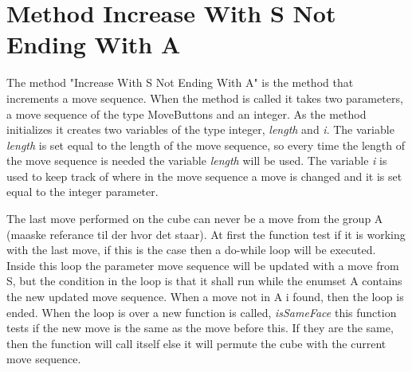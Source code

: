 \section{Method Increase With S Not Ending With A}

The method "Increase With S Not Ending With A" is the method that increments a move sequence. When the method is called it takes two parameters, a move sequence of the type MoveButtons and an integer. As the method initializes it creates two variables of the type integer, \textit{length} and \textit{i}. The variable \textit{length} is set equal to the length of the move sequence, so every time the length of the move sequence is needed the variable \textit{length} will be used. The variable \textit{i} is used to keep track of where in the move sequence a move is changed and it is set equal to the integer parameter. 

The last move performed on the cube can never be a move from the group A (maaske referance til der hvor det staar). At first the function test if it is working with the last move, if this is the case then a do-while loop will be executed. Inside this loop the parameter move sequence will be updated with a move from S, but the condition in the loop is that it shall run while the enumset A contains the new updated move sequence. When a move not in A i found, then the loop is ended.
When the loop is over a new function is called, \textit{isSameFace} this function tests if the new move is the same as the move before this. If they are the same, then the function will call itself else it will permute the cube with the current move sequence. 


